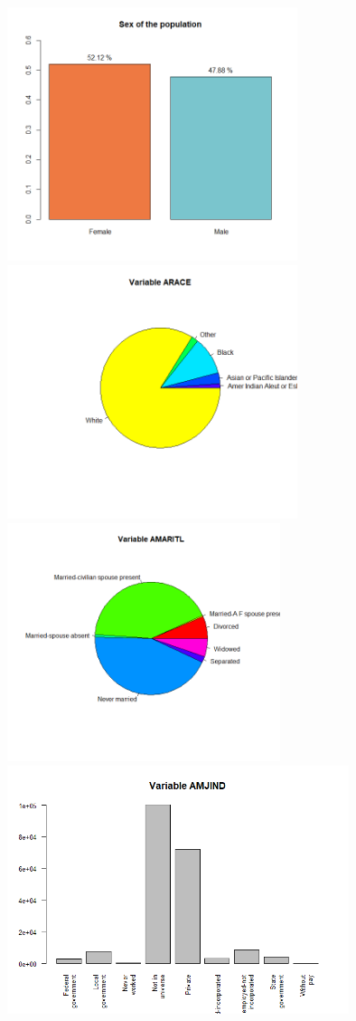 \documentclass{article}
\begin{document}
\begin{center}
\includegraphics[width=8.5cm]{ASEX.png}
\includegraphics[width=8.5cm]{ARACE.png}\\
\includegraphics[width=8cm]{AMARITL.png}
\includegraphics[width=10cm]{AMJIND.png}\\

\end{center}
\end{document}
